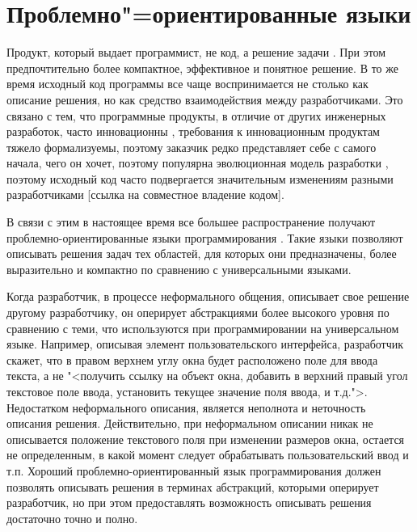 \section{Проблемно"=ориентированные языки}
Продукт, который выдает программист, не код, а решение задачи \cite{dmitriev}. При этом предпочтительно более компактное, эффективное и понятное решение. В то же время исходный код программы все чаще воспринимается не столько как описание решения, но как средство взаимодействия между разработчиками. Это связано с тем, что программные продукты, в отличие от других инженерных разработок, часто инновационны \cite{brooks}, требования к инновационным продуктам тяжело формализуемы, поэтому заказчик редко представляет себе с самого начала, чего он хочет, поэтому популярна эволюционная модель разработки \cite{gost12207-99,evolutionModel}, поэтому исходный код часто подвергается значительным изменениям разными разработчиками [ссылка на совместное владение кодом].

В связи с этим в настоящее время все большее распространение получают проблемно-ориентированные языки программирования \cite{fowler01}. Такие языки позволяют описывать решения задач тех областей, для которых они предназначены, более выразительно и компактно по сравнению с универсальными языками.

Когда разработчик, в процессе неформального общения, описывает свое решение другому разработчику, он оперирует абстракциями более высокого уровня по сравнению с теми, что используются при программировании на универсальном языке. Например, описывая элемент пользовательского интерфейса, разработчик скажет, что в правом верхнем углу окна будет расположено поле для ввода текста, а не "<получить ссылку на объект окна, добавить в верхний правый угол текстовое поле ввода, установить текущее значение поля ввода, и т.д.">. Недостатком неформального описания, является неполнота и неточность описания решения. Действительно, при неформальном описании никак не описывается положение текстового поля при изменении размеров окна, остается не определенным, в какой момент следует обрабатывать пользовательский ввод и т.п. Хороший проблемно-ориентированный язык программирования должен позволять описывать решения в терминах абстракций, которыми оперирует разработчик, но при этом предоставлять возможность описывать решения достаточно точно и полно.
